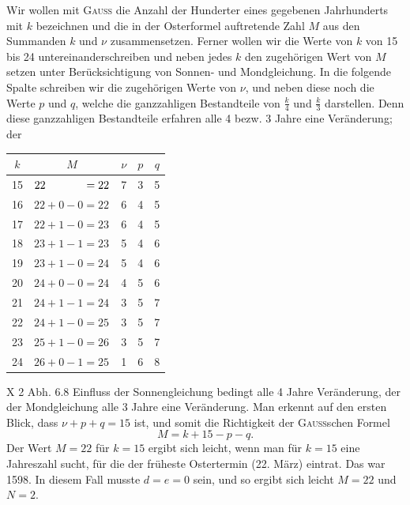Wir wollen mit \textsc{Gauss} die Anzahl der Hunderter eines gegebenen Jahrhunderts mit $k$ bezeichnen und die in der Osterformel auftretende Zahl $M$ aus den Summanden $k$ und $\nu$ zusammensetzen. Ferner wollen
wir die Werte von $k$ von 15 bis 24 untereinanderschreiben und neben jedes $k$ den zugehörigen Wert von $M$ setzen unter Berücksichtigung von Sonnen- und Mondgleichung. In die
folgende Spalte schreiben wir die zugehörigen
Werte von $\nu$, und neben diese noch die Werte
$p$ und $q$, welche die ganzzahligen Bestandteile
von $\frac{k}{4}$ und $\frac{k}{3}$ darstellen. Denn diese ganzzahligen Bestandteile erfahren alle 4 bezw. 3 Jahre eine Veränderung; der
\begin{center}\setlength{\tabcolsep}{5pt}\renewcommand{\arraystretch}{1.15}
\begin{tabular}{c|l|c|c|c}\hline\hline
$k$&\multicolumn{1}{c|}{$M$}&$\nu$&$p$&$q$\\\hline\hline
15&$22\hphantom{{}+0-0}=22$&7&3&5\\
16&$22+0-0=22$&6&4&5\\
17&$22+1-0=23$&6&4&5\\
18&$23+1-1=23$&5&4&6\\
19&$23+1-0=24$&5&4&6\\
20&$24+0-0=24$&4&5&6\\
21&$24+1-1=24$&3&5&7\\
22&$24+1-0=25$&3&5&7\\
23&$25+1-0=26$&3&5&7\\
24&$26+0-1=25$&1&6&8
\end{tabular}\end{center}
\par\noindent X 2 Abh. 6.\hfill 8
\clearpage{}
\setcounter{footnote}{0}
\noindent Einfluss der Sonnengleichung bedingt alle 4 Jahre  Veränderung, der
der Mondgleichung alle 3 Jahre eine Veränderung. Man erkennt auf den
ersten Blick, dass $\nu+p+q=15$ ist, und somit die Richtigkeit der \textsc{Gauss}schen Formel
\[
M=k+15-p-q.
\]
\noindent Der Wert $M=22$ für $k=15$ ergibt sich leicht, wenn man für $k=15$ eine
Jahreszahl sucht, für die der früheste Ostertermin (22. März) eintrat. Das
war 1598. In diesem Fall musste $d=e=0$ sein, und so ergibt sich leicht
$M=22$ und $N=2$.

